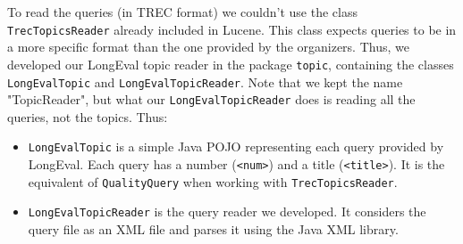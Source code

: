 To read the queries (in TREC format) we couldn't use the class \texttt{TrecTopicsReader} already included in Lucene.
This class expects queries to be in a more specific format than the one provided by the organizers.
Thus, we developed our LongEval topic reader in the package \texttt{topic}, containing the classes
\texttt{LongEvalTopic} and \texttt{LongEvalTopicReader}.
Note that we kept the name "TopicReader", but what our \texttt{LongEvalTopicReader} does is reading all the queries,
not the topics.
Thus:
\begin{itemize}
    \item \texttt{LongEvalTopic} is a simple Java POJO representing each query provided by LongEval.
          Each query has a number (\texttt{<num>}) and a title (\texttt{<title>}).
          It is the equivalent of \texttt{QualityQuery} when working with \texttt{TrecTopicsReader}.
    \item \texttt{LongEvalTopicReader} is the query reader we developed.
          It considers the query file as an XML file and parses it using the Java XML library.
\end{itemize}